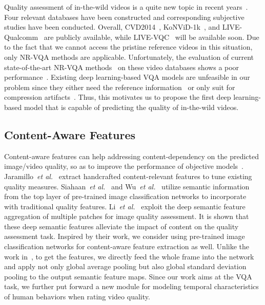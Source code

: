 \documentclass[sigconf]{acmart}
\begin{document}
Quality assessment of in-the-wild videos is a quite new topic in recent years~\cite{hosu2017konstanz,ghadiyaram2018capture, nuutinen2016cvd2014,sinno2018large}. 
Four relevant databases have been constructed and corresponding subjective studies have been conducted. 
Overall, CVD2014~\cite{nuutinen2016cvd2014}, KoNViD-1k~\cite{hosu2017konstanz}, and LIVE-Qualcomm~\cite{ghadiyaram2018capture} are publicly available, while LIVE-VQC~\cite{sinno2018large} will be available soon.
Due to the fact that we cannot access the pristine reference videos in this situation, only NR-VQA methods are applicable. 
Unfortunately, the evaluation of current state-of-the-art NR-VQA methods~\cite{mittal2016completely,saad2014blind} on these video databases shows a poor performance~\cite{men2017empirical,ghadiyaram2018capture, nuutinen2016cvd2014,sinno2018large}. 
Existing deep learning-based VQA models are unfeasible in our problem since they either need the reference information~\cite{zhang2018blind,kim2018deep,zhang2019objective} or only suit for compression artifacts~\cite{liu2018end}.
Thus, this motivates us to propose the first deep learning-based model that is capable of predicting the quality of in-the-wild videos.

\subsection{Content-Aware Features}
Content-aware features can help addressing content-dependency on the predicted image/video quality, so as to improve the performance of objective models~\cite{jaramillo2016content,siahaan2018semantic,wu2019blind,li2019has}.
Jaramillo~\textit{et al.}~\cite{jaramillo2016content} extract handcrafted content-relevant features to tune existing quality measures.
Siahaan~\textit{et al.}~\cite{siahaan2018semantic} and Wu~\textit{et al.}~\cite{wu2019blind} utilize semantic information from the top layer of pre-trained image classification networks to incorporate with traditional quality features. 
Li~\textit{et al.}~\cite{li2019has} exploit the deep semantic feature aggregation of multiple patches for image quality assessment. 
It is shown that these deep semantic features alleviate the impact of content on the quality assessment task. 
Inspired by their work, we consider using pre-trained image classification networks for content-aware feature extraction as well. 
Unlike the work in~\cite{li2019has}, to get the features, we directly feed the whole frame into the network and apply not only global average pooling but also global standard deviation pooling to the output semantic feature maps. 
Since our work aims at the VQA task, we further put forward a new module for modeling temporal characteristics of human behaviors when rating video quality.
\end{document}
